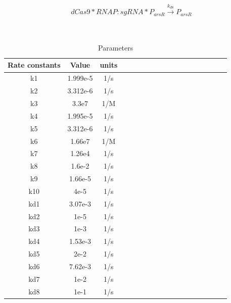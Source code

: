 
\begin{equation}
dCas9*RNAP:sgRNA*P_{arsR}\stackrel{k_{d8}}{\longrightarrow}P_{arsR}
\end{equation}
\\\\
\begin{table}[htbp]
	\centering
	\caption{\label {tab:test} Parameters}
	\begin{tabular}{cccccccccccccccccc}
		\toprule
		Rate constants & Value& units \\
		\midrule
		k1 & 1.999e-5 &1/s \\
		k2 & 3.312e-6 &1/s \\
		k3 & 3.3e7    & 1/M    \\
		k4 &1.995e-5 &1/s\\
		k5 & 3.312e-6 &1/s \\
		k6 &1.66e7   &1/M  \\
		k7  &1.26e4 &1/s  \\
		k8&1.6e-2& 1/s\\
		k9 &1.66e-5&1/s\\ 
		k10&4e-5&1/s\\
		kd1 & 3.07e-3&1/s\\
		kd2&1e-5&1/s\\
		kd3&1e-3&1/s\\
		kd4&1.53e-3&1/s\\
		kd5 & 2e-2&1/s\\
		kd6&7.62e-3&1/s\\
		kd7& 1e-2&1/s\\
		kd8&1e-1&1/s\\		
		\bottomrule
	\end{tabular}
\end{table}



